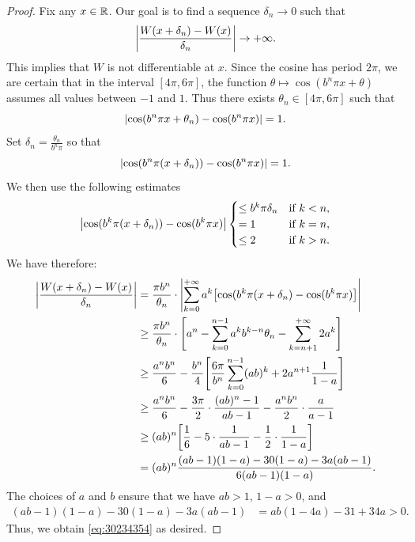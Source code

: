 \begin{proof}
Fix any $x\in {\mathbb R}$. Our goal is to find a sequence $\delta_n\to 0$ such that
\begin{equation}\label{eq:30234354}
  {\left|\frac{W(x+\delta_n) - W(x)}{\delta_n}\right|} \to +\infty.
\end{equation}
This implies that $W$ is not differentiable at $x$. Since the cosine has period
$2\pi$, we are certain that in the interval $[4\pi,6\pi]$, the function $\theta
\mapsto \cos(b^n \pi x+\theta)$ assumes all values between $-1$ and $1$. Thus
there exists $\theta_n \in [4\pi,6\pi]$ such that
\[
   {\left|\cos (b^n \pi x + \theta_n) - \cos(b^n\pi x)\right|} = 1.
\]
Set $\delta_n = \frac{\theta_n}{b^n \pi}$ so that
\[
  {\left|\cos (b^n \pi (x+\delta_n))- \cos(b^n \pi x)\right|} = 1.
\]
We then use the following estimates
\[
  {\left|\cos(b^k\pi (x + \delta_n)) - \cos(b^k \pi x)\right|}
  \begin{cases}
    \le b^k\pi\delta_n &\text{if $k<n$},\\
    = 1 &\text{if $k=n$},\\
    \le 2 &\text{if $k>n$}.
  \end{cases}
\]
We have therefore:
\begin{align*}
    {\left|\frac{W(x+\delta_n) - W(x)}{\delta_n}\right|} 
        &= \frac{\pi b^n}{\theta_n}\cdot
    {\left|\sum_{k=0}^{+\infty}a^k{\left[ \cos(b^k\pi (x + \delta_n) - \cos(b^k
    \pi x) \right]}\right|}  \\
        &\ge \frac{\pi b^n}{\theta_n}\cdot {\left[ a^n - \sum_{k=0}^{n-1} a^k
    b^{k-n} \theta_n - \sum_{k=n+1}^{+\infty} 2a^k \right]} \\
        &\ge \frac{a^n b^n}{6} -
    \frac{b^n}{4}{\left[ \frac{6\pi}{b^n}\sum_{k=0}^{n-1} (ab)^k + 2 a^{n+1}
    \frac{1}{1-a} \right]} \\
        &\ge \frac{a^n b^n}{6} -\frac {3\pi} 2\cdot  \frac{(ab)^n-1}{ab-1} -
    \frac{a^n b^n}{2}\cdot \frac{a}{a-1}\\
        &\ge (ab)^n {\left[ \frac 1 6 - 5\cdot \frac{1}{ab-1} - \frac 1 2 \cdot
    \frac{1}{1-a} \right]} \\
    &= (ab)^n \frac{(ab-1)(1-a)-30(1-a)-3a(ab-1)}{6(ab-1)(1-a)}.
\end{align*}
The choices of $a$ and $b$ ensure that we have $ab>1$, $1-a>0$, and
\begin{align*}
(ab-1)(1-a)-30(1-a)-3a(ab-1)
&= ab(1-4a) - 31 + 34a > 0.
\end{align*}
Thus, we obtain \eqref{eq:30234354} as desired.
\end{proof}